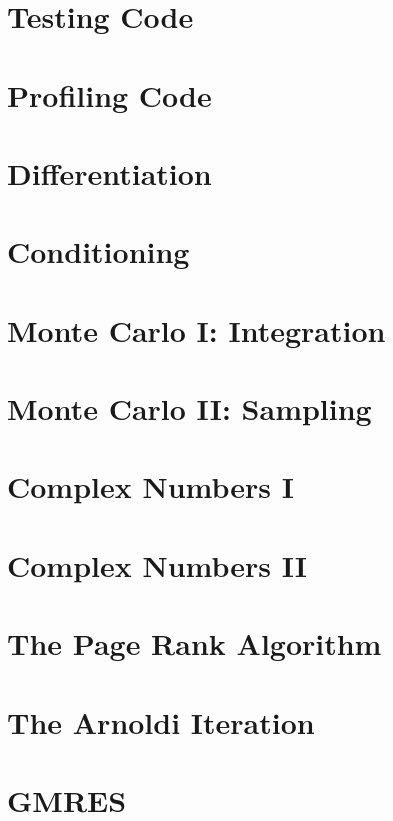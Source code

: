 
\section*{Testing Code} %

\section*{Profiling Code} %

\section*{Differentiation} %

\section*{Conditioning} %


\section*{Monte Carlo I: Integration} %

\section*{Monte Carlo II: Sampling} %

\section*{Complex Numbers I} %

\section*{Complex Numbers II} %

\section*{The Page Rank Algorithm} %

\section*{The Arnoldi Iteration} %

\section*{GMRES} %
